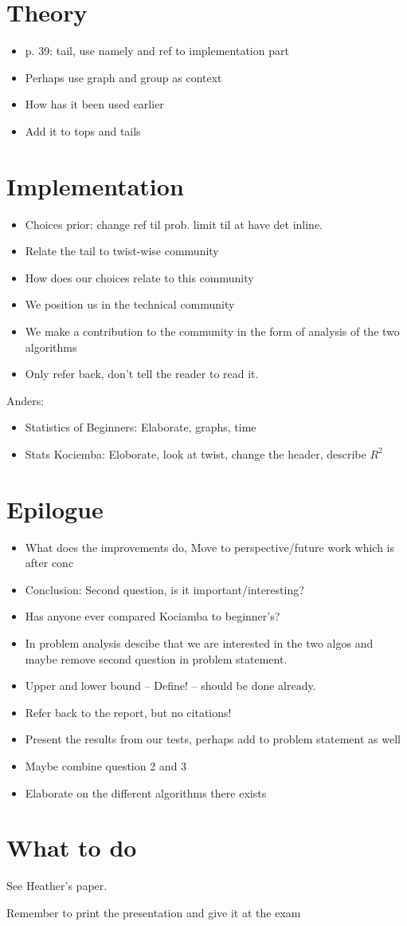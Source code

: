 \documentclass{article}
\begin{document}
\section{Theory}
\begin{itemize}
	\item p. 39: tail, use namely and ref to implementation part
	\item Perhaps use graph and group as context
	\item How has it been used earlier
	\item Add it to tops and tails
\end{itemize}

\section{Implementation}
\begin{itemize}
	\item Choices prior: change ref til prob. limit til at have det inline.
	\item Relate the tail to twist-wise community
	\item How does our choices relate to this community
	\item We position us in the technical community
	\item We make a contribution to the community in the form of analysis of the two algorithms
	\item Only refer back, don't tell the reader to read it.
\end{itemize}

Anders:
\begin{itemize}
	\item Statistics of Beginners: Elaborate, graphs, time
	\item Stats Kociemba: Eloborate, look at twist, change the header, describe $R^2$
\end{itemize}

\section{Epilogue}
\begin{itemize}
	\item What does the improvements do, Move to perspective/future work which is after conc
	\item Conclusion: Second question, is it important/interesting?
	\item Has anyone ever compared Kociamba to beginner's?
	\item In problem analysis descibe that we are interested in the two algos and maybe remove second question in problem statement.
	\item Upper and lower bound -- Define! -- should be done already.
	\item Refer back to the report, but no citations!
	\item Present the results from our tests, perhaps add to problem statement as well
	\item Maybe combine question 2 and 3
	\item Elaborate on the different algorithms there exists
\end{itemize}

\section{What to do}
See Heather's paper.


Remember to print the presentation and give it at the exam
\end{document}
